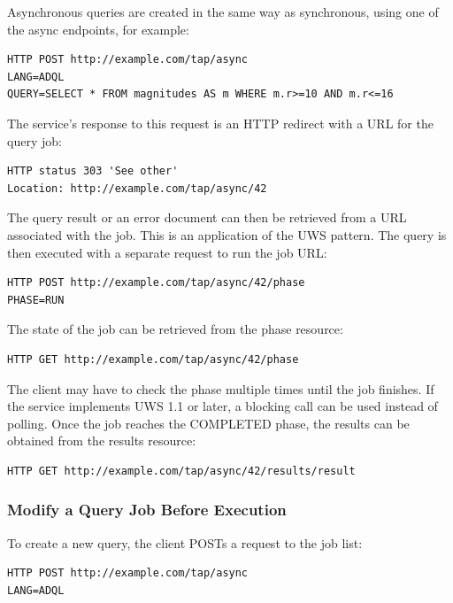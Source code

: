 \documentclass[11pt,letter]{ivoa}
\begin{document}
Asynchronous queries are created in the same way as synchronous, using 
one of the {async} endpoints, for example:

\begin{verbatim}
HTTP POST http://example.com/tap/async
LANG=ADQL
QUERY=SELECT * FROM magnitudes AS m WHERE m.r>=10 AND m.r<=16
\end{verbatim}

The service's response to this request is an HTTP redirect with a URL for the 
query job:

\begin{verbatim}
HTTP status 303 'See other'
Location: http://example.com/tap/async/42
\end{verbatim}

The query result or an error document can then be retrieved from a URL 
associated with the job. This is an application of the UWS pattern. The query is 
then executed with a separate request to run the job URL:

\begin{verbatim}
HTTP POST http://example.com/tap/async/42/phase
PHASE=RUN
\end{verbatim}

The state of the job can be retrieved from the phase resource:

\begin{verbatim}
HTTP GET http://example.com/tap/async/42/phase
\end{verbatim}

The client may have to check the phase multiple times until the job 
finishes. If the service implements UWS 1.1 \citep{2016ivoa.spec.1024H} or later, a blocking call
can be used instead of polling. Once the job reaches the COMPLETED phase, 
the results can be obtained from the results resource:

\begin{verbatim}
HTTP GET http://example.com/tap/async/42/results/result
\end{verbatim}

\subsubsection{Modify a Query Job Before Execution}
To create a new query, the client POSTs a request to the job list:

\begin{verbatim}
HTTP POST http://example.com/tap/async
LANG=ADQL
\end{verbatim}
\end{document}
